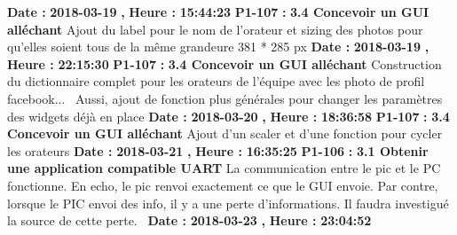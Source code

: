 \documentclass{article}%
\begin{document}
\newline%
%
\textbf{Date : }%
\textbf{2018{-}03{-}19}%
\textbf{,}%
\textbf{ Heure : }%
\textbf{15:44:23}%
\newline%
%
\textbf{P1{-}107 }%
\textbf{ : }%
\textbf{ 3.4 Concevoir un GUI alléchant}%
\newline%
\newline%
%
Ajout du label pour le nom de l'orateur et sizing des photos pour qu'elles soient tous de la même grandeure 381 * 285 px\newline%
\newline%
%
\textbf{Date : }%
\textbf{2018{-}03{-}19}%
\textbf{,}%
\textbf{ Heure : }%
\textbf{22:15:30}%
\newline%
%
\textbf{P1{-}107 }%
\textbf{ : }%
\textbf{ 3.4 Concevoir un GUI alléchant}%
\newline%
\newline%
%
Construction du dictionnaire complet pour les orateurs de l'équipe avec les photo de profil facebook...~\newline%
Aussi, ajout de fonction plus générales pour changer les paramètres des widgets déjà en place\newline%
\newline%
%
\textbf{Date : }%
\textbf{2018{-}03{-}20}%
\textbf{,}%
\textbf{ Heure : }%
\textbf{18:36:58}%
\newline%
%
\textbf{P1{-}107 }%
\textbf{ : }%
\textbf{ 3.4 Concevoir un GUI alléchant}%
\newline%
\newline%
%
Ajout d'un scaler et d'une fonction pour cycler les orateurs\newline%
\newline%
%
\textbf{Date : }%
\textbf{2018{-}03{-}21}%
\textbf{,}%
\textbf{ Heure : }%
\textbf{16:35:25}%
\newline%
%
\textbf{P1{-}106 }%
\textbf{ : }%
\textbf{ 3.1 Obtenir une application compatible UART}%
\newline%
\newline%
%
La communication entre le pic et le PC fonctionne. En echo, le pic renvoi exactement ce que le GUI envoie.\newline%
Par contre, lorsque le PIC envoi des info, il y a une perte d'informations. Il faudra investigué la source de cette perte.~\newline%
\newline%
%
\textbf{Date : }%
\textbf{2018{-}03{-}23}%
\textbf{,}%
\textbf{ Heure : }%
\textbf{23:04:52}%
\newline%
\end{document}
